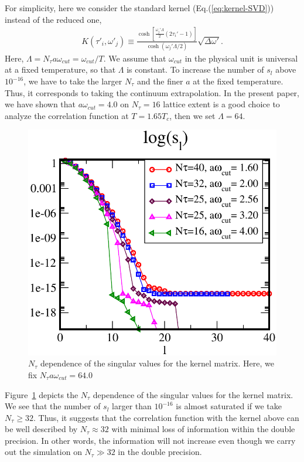 \documentclass[a4paper,11pt]{article}
\newcommand\beq{ \begin{eqnarray} }
\newcommand\eeq{ \end{eqnarray} }
\begin{document}
For simplicity, here we consider the standard kernel (Eq.(\ref{eq:kernel-SVD})) instead of the reduced one,
\beq
K(\tau'_i,\omega'_j)  \equiv \frac{\cosh [\frac{\omega_j ' \Lambda }{2} (2 \tau_i' -1)]}{\cosh (\omega_j ' \Lambda /2)} \sqrt{\Delta \omega'}.
\eeq
Here, $\Lambda =  N_\tau a \omega_{cut} =\omega_{cut}/T $.
We assume that $\omega_{cut}$ in the physical unit is universal at a fixed temperature, so that $\Lambda$ is constant.
To increase the number of $s_l$ above $10^{-16}$, we have to take the larger $N_\tau$ and the finer $a$ at the fixed temperature.
Thus, it corresponds to taking the continuum extrapolation.
In the present paper, we have shown that  $a\omega_{cut}=4.0$ on $N_\tau=16$ lattice extent is a good choice to analyze the correlation function at $T=1.65T_c$, then we set $\Lambda=64$.

\begin{figure}[h]
\begin{center}
\includegraphics[scale=0.55]{./log_sl_l_Ntau-deps.pdf}
\caption{$N_\tau$ dependence of the singular values for the kernel matrix. Here, we fix $N_\tau a \omega_{cut}=64.0$  }
\label{fig:log-sl-Ntau-deps}
\end{center}
\end{figure}
Figure~\ref{fig:log-sl-Ntau-deps} depicts the $N_\tau$ dependence of the singular values for the kernel matrix.
We see that the number of $s_l$ larger than $10^{-16}$ is almost saturated if we take $N_\tau \ge 32$.
Thus, it suggests that  the correlation function with the kernel above can be well described by $N_\tau \approx 32$ with minimal loss of information within the double precision.
In other words, the information will not increase even though we carry out the simulation on $N_\tau \gg 32$ in the double precision.
\end{document}
